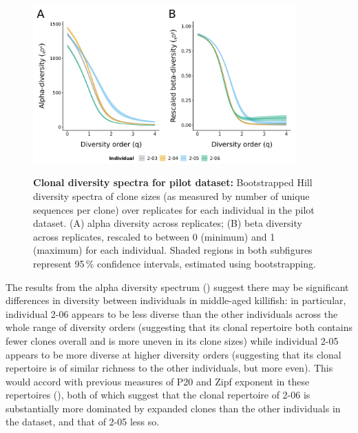 \begin{figure}
\centering
\includegraphics[width = 0.9\textwidth]{_Figures/png/pilot-clone-diversity}
\begin{subfigure}{0em}
\label{fig:igseq-pilot-clone-diversity-alpha}
\end{subfigure}
\begin{subfigure}{0em}
\label{fig:igseq-pilot-clone-diversity-beta}
\end{subfigure}
\caption[Clonal diversity spectra for \igseq pilot dataset]{\textbf{Clonal diversity spectra for \igseq pilot dataset:} Bootstrapped Hill diversity spectra of clone sizes (as measured by number of unique sequences per clone) over replicates for each individual in the pilot dataset. (A) alpha diversity across replicates; (B) beta diversity across replicates, rescaled to between 0 (minimum) and 1 (maximum) for each individual. Shaded regions in both subfigures represent 95\,\% confidence intervals, estimated using bootstrapping.}
\label{fig:igseq-pilot-clone-diversity}
\end{figure}

The results from the alpha diversity spectrum () suggest there may be significant differences in diversity between individuals in middle-aged killifish: in particular, individual 2-06 appears to be less diverse than the other individuals across the whole range of diversity orders (suggesting that its clonal repertoire both contains fewer clones overall and is more uneven in its clone sizes) while individual 2-05 appears to be more diverse at higher diversity orders (suggesting that its clonal repertoire is of similar richness to the other individuals, but more even). This would accord with previous measures of P20 and Zipf exponent in these repertoires (), both of which suggest that the clonal repertoire of 2-06 is substantially more dominated by expanded clones than the other individuals in the dataset, and that of 2-05 less so.


